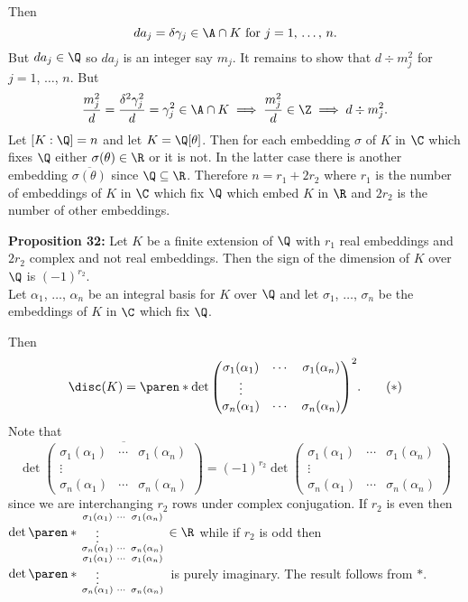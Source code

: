 Then
\[ da_j = \delta\gamma_j\in\A\cap K\text{ for $j=1$, $\dotsc$, $n$.} \]
But $da_j\in\Q$ so $da_j$ is an integer say $m_j$.  It remains to show that $d\div m_j^2$ for $j=1$, $\dotsc$, $n$.  But
\[ \frac{m_j^2}{d} = \frac{\delta^2\gamma_j^2}{d} = \gamma_j^2 \in \A\cap K \implies \frac{m_j^2}{d} \in \Z \implies d \div m_j^2 . \]
Let $[K:\Q]=n$ and let $K=\Q[\theta]$.  Then for each embedding $\sigma$ of $K$ in $\C$ which fixes $\Q$ either $\sigma(\theta)\in\R$ or it is not.  In the latter case there is another embedding $\overline{\sigma(\theta)}$ since $\Q\subseteq\R$.  Therefore $n=r_1+2r_2$ where $r_1$ is the number of embeddings of $K$ in $\C$ which fix $\Q$ which embed $K$ in $\R$ and $2r_2$ is the number of other embeddings.

\textbf{Proposition 32:} Let $K$ be a finite extension of $\Q$ with $r_1$ real embeddings and $2r_2$ complex and not real embeddings.  Then the sign of the dimension of $K$ over $\Q$ is $(-1)^{r_2}$. \\
\pf Let $\alpha_1$, $\dotsc$, $\alpha_n$ be an integral basis for $K$ over $\Q$ and let $\sigma_1$, $\dotsc$, $\sigma_n$ be the embeddings of $K$ in $\C$ which fix $\Q$.

Then
\[ \disc(K) = \paren*{\det\begin{pmatrix}
\sigma_1(\alpha_1) & \cdots & \sigma_1(\alpha_n) \\
\vdots \\
\sigma_n(\alpha_1) & \cdots & \sigma_n(\alpha_n)
\end{pmatrix}}^2 . \tag{$*$} \]
Note that
\[ \det\overline{\begin{pmatrix}
\sigma_1(\alpha_1) & \cdots & \sigma_1(\alpha_n) \\
\vdots \\
\sigma_n(\alpha_1) & \cdots & \sigma_n(\alpha_n)
\end{pmatrix}} = (-1)^{r_2}\det\begin{pmatrix}
\sigma_1(\alpha_1) & \cdots & \sigma_1(\alpha_n) \\
\vdots \\
\sigma_n(\alpha_1) & \cdots & \sigma_n(\alpha_n)
\end{pmatrix} \]
since we are interchanging $r_2$ rows under complex conjugation.  If $r_2$ is even then $\det\paren*{\begin{smallmatrix}
\sigma_1(\alpha_1) & \cdots & \sigma_1(\alpha_n) \\
\vdots \\
\sigma_n(\alpha_1) & \cdots & \sigma_n(\alpha_n)
\end{smallmatrix}}\in\R$ while if $r_2$ is odd then $\det\paren*{\begin{smallmatrix}
\sigma_1(\alpha_1) & \cdots & \sigma_1(\alpha_n) \\
\vdots \\
\sigma_n(\alpha_1) & \cdots & \sigma_n(\alpha_n)
\end{smallmatrix}}$ is purely imaginary.  The result follows from $*$.

